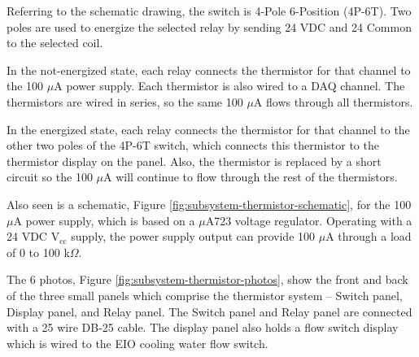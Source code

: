Referring to the schematic drawing, the switch is 4-Pole 6-Position (4P-6T).  Two poles are used to energize the selected relay by sending 24 VDC and 24 Common to the selected coil.

In the not-energized state, each relay connects the thermistor for that channel to the 100 $\mu$A power supply.  Each thermistor is also wired to a DAQ channel.  The thermistors are wired in series, so the same 100 $\mu$A flows through all thermistors.

In the energized state, each relay connects the thermistor for that channel to the other two poles of the 4P-6T switch, which connects this thermistor to the thermistor display on the panel.  Also, the thermistor is replaced by a short circuit so the 100 $\mu$A will continue to flow through the rest of the thermistors.

Also seen is a schematic, Figure \ref{fig:subsystem-thermistor-schematic}, for the 100 $\mu$A power supply, which is based on a $\mu$A723 voltage regulator.  Operating with a 24 VDC V$_{\textrm{cc}}$ supply, the power supply output can provide 100 $\mu$A through a load of 0 to 100 k$\Omega$.

The 6 photos, Figure \ref{fig:subsystem-thermistor-photos}, show the front and back of the three small panels which comprise the thermistor system – Switch panel, Display panel, and Relay panel.  The Switch panel and Relay panel are connected with a 25 wire DB-25 cable.  The display panel also holds a flow switch display which is wired to the EIO cooling water flow switch.


